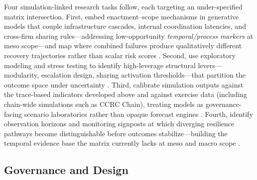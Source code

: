 Four simulation-linked research tasks follow, each targeting an under-specified matrix intersection. First, embed enactment--scope mechanisms in generative models that couple infrastructure cascades, internal coordination latencies, and cross-firm sharing rules---addressing low-opportunity \emph{temporal/process markers} at meso scope---and map where combined failures produce qualitatively different recovery trajectories rather than scalar risk scores \autocite{arnold2004informationsharing,dawson2011agentbased,linkov2013resilience}. Second, use exploratory modeling and stress testing to identify high-leverage structural levers---modularity, escalation design, sharing activation thresholds---that partition the outcome space under uncertainty \autocite{cutter2010disaster}. Third, calibrate simulation outputs against the trace-based indicators developed above and against exercise data (including chain-wide simulations such as CCRC Chain), treating models as governance-facing scenario laboratories rather than opaque forecast engines \autocite{ecb2018tiber,ccrc2024chain}. Fourth, identify observation horizons and monitoring signposts at which diverging resilience pathways become distinguishable before outcomes stabilize---building the temporal evidence base the matrix currently lacks at meso and macro scope \autocite{francis2014metric,kwakkel2016comparing,meerow2016defining,nist2024csf}.

\subsection{Governance and Design}

